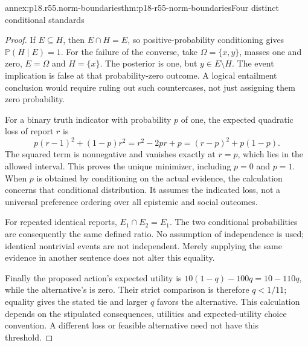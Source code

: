\begin{annexitem}{annex:p18.r55.norm-boundaries}{thm:p18-r55-norm-boundaries}{Four distinct conditional standards}
\begin{proof}
If \(E\subseteq H\), then \(E\cap H=E\), so positive-probability
conditioning gives \(\mathbb P(H\mid E)=1\). For the failure
of the converse, take \(\Omega=\{x,y\}\), masses one and zero,
\(E=\Omega\) and \(H=\{x\}\). The posterior is one,
but \(y\in E\setminus H\). The event implication is false
at that probability-zero outcome. A logical entailment conclusion
would require ruling out such countercases, not just assigning
them zero probability.

For a binary truth indicator with probability \(p\) of one,
the expected quadratic loss of report \(r\) is
\[
 p(r-1)^2+(1-p)r^2
  =r^2-2pr+p=(r-p)^2+p(1-p).
\]
The squared term is nonnegative and vanishes exactly at \(r=p\),
which lies in the allowed interval. This proves the unique minimizer,
including \(p=0\) and \(p=1\). When \(p\) is obtained by
conditioning on the actual evidence, the calculation concerns that
conditional distribution. It assumes the indicated loss, not a
universal preference ordering over all epistemic and social outcomes.

For repeated identical reports, \(E_1\cap E_2=E_1\).
The two conditional probabilities are consequently the same defined
ratio. No assumption of independence is used; identical nontrivial
events are not independent. Merely supplying the same evidence in
another sentence does not alter this equality.

Finally the proposed action's expected utility is
\(10(1-q)-100q=10-110q\), while the alternative's is zero.
Their strict comparison is therefore \(q<1/11\); equality gives
the stated tie and larger \(q\) favors the alternative. This
calculation depends on the stipulated consequences, utilities and
expected-utility choice convention. A different loss or feasible
alternative need not have this threshold.
\end{proof}
\end{annexitem}

